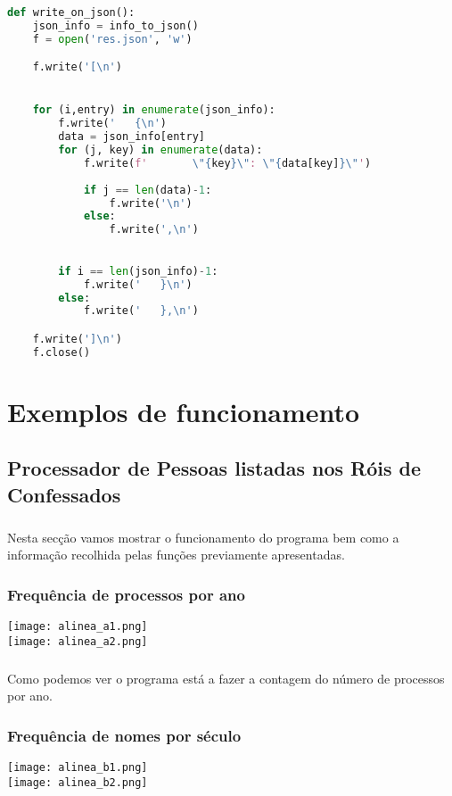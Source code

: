 \documentclass[11pt,a4paper]{report}
\begin{document}
\begin{enumerate}[label=\alph*.]
    \begin{lstlisting}[language=Python, caption=Função info\_to\_json]
def write_on_json():
    json_info = info_to_json()    
    f = open('res.json', 'w')

    f.write('[\n')


    for (i,entry) in enumerate(json_info):
        f.write('   {\n')
        data = json_info[entry]
        for (j, key) in enumerate(data):
            f.write(f'       \"{key}\": \"{data[key]}\"')
            
            if j == len(data)-1:
                f.write('\n')
            else:
                f.write(',\n')
            

        if i == len(json_info)-1:
            f.write('   }\n')
        else:
            f.write('   },\n')

    f.write(']\n')
    f.close()
    \end{lstlisting}
    
    \end{enumerate}


    \chapter{Exemplos de funcionamento}
    \section{Processador de Pessoas listadas nos Róis de Confessados}
    \paragraph{}
    Nesta secção vamos mostrar o funcionamento do programa bem como a informação recolhida pelas funções previamente apresentadas.
    \subsection{Frequência de processos por ano}
    \texttt{[image: alinea\_a1.png]} \\
	\texttt{[image: alinea\_a2.png]}
    \paragraph{}
    Como podemos ver o programa está a fazer a contagem do número de processos por ano.
    
    \subsection{Frequência de nomes por século}
    \texttt{[image: alinea\_b1.png]} \\
	\texttt{[image: alinea\_b2.png]}
\end{document}
